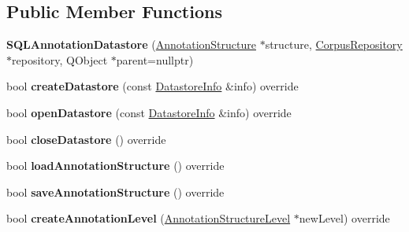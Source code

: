 \subsection*{Public Member Functions}
\begin{DoxyCompactItemize}
\item 
\mbox{\label{class_s_q_l_annotation_datastore_a1e406050037aaa942f62ca070ae5aa5e}} 
{\bfseries S\+Q\+L\+Annotation\+Datastore} (\hyperlink{class_annotation_structure}{Annotation\+Structure} $\ast$structure, \hyperlink{class_corpus_repository}{Corpus\+Repository} $\ast$repository, Q\+Object $\ast$parent=nullptr)
\item 
\mbox{\label{class_s_q_l_annotation_datastore_ad568363c1590539a74700a8ae216cf46}} 
bool {\bfseries create\+Datastore} (const \hyperlink{class_datastore_info}{Datastore\+Info} \&info) override
\item 
\mbox{\label{class_s_q_l_annotation_datastore_a6b9198fc94993568f135235f6ca12392}} 
bool {\bfseries open\+Datastore} (const \hyperlink{class_datastore_info}{Datastore\+Info} \&info) override
\item 
\mbox{\label{class_s_q_l_annotation_datastore_aa5607aaa73a4cae01a39029936cf34cd}} 
bool {\bfseries close\+Datastore} () override
\item 
\mbox{\label{class_s_q_l_annotation_datastore_a6ac1c0b466b24d623fa1967bffc4c5f1}} 
bool {\bfseries load\+Annotation\+Structure} () override
\item 
\mbox{\label{class_s_q_l_annotation_datastore_a4f76f06bdf51708e7e77fe9238f81b1f}} 
bool {\bfseries save\+Annotation\+Structure} () override
\item 
\mbox{\label{class_s_q_l_annotation_datastore_a787c6892746d2cddd5ef142044d09d46}} 
bool {\bfseries create\+Annotation\+Level} (\hyperlink{class_annotation_structure_level}{Annotation\+Structure\+Level} $\ast$new\+Level) override
\item 
\mbox{\label{class_s_q_l_annotation_datastore_a61cb4d9098cddd77ab77975eb10338b5}} 

\end{DoxyCompactItemize}
